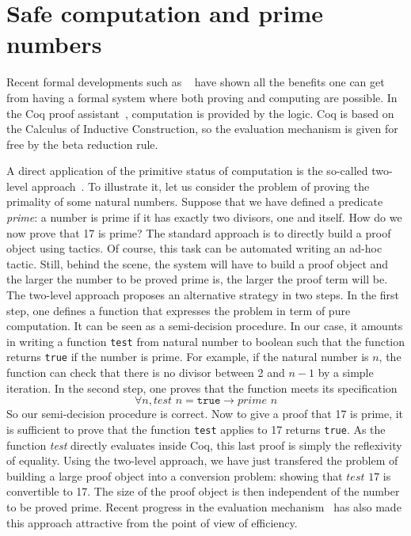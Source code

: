

\section{Safe computation and prime numbers}

Recent formal developments such as ~\cite{4color,kepler} have shown all the benefits
one can get from having a formal system where both proving and computing are
possible. In the {\sc Coq} proof assistant~\cite{Coq}, computation is
provided by the logic. {\sc Coq} is based on the Calculus of 
Inductive Construction, so the evaluation mechanism is given for free
by the beta reduction rule. 

A direct application of the primitive status of computation is 
the so-called two-level approach~\cite{boutin}. To illustrate it, 
let us consider the problem of proving the primality of some natural 
numbers.
Suppose that we have defined a predicate {\it prime}: a number is prime 
if it has exactly two divisors, one and itself. 
How do we now prove that 17 is prime? The standard approach is to
directly build a proof object using tactics. Of course, this task can be 
automated writing an ad-hoc tactic. Still, behind the scene, the system 
will have to build a proof object and the larger the number to be proved
prime is, the larger the proof term will be.
The two-level approach proposes an alternative
strategy in two steps. In the first step, one defines a function that expresses
the problem in term of pure computation. It can be seen as a semi-decision procedure.
In our case, it amounts in writing a 
function {\tt test} from natural number to boolean such that the function
returns {\tt true} if the number is prime. For example, if the natural number
is $n$, the function can check that there is no divisor between 2 and $n-1$
by a simple iteration. In the second step, one proves that the function meets 
its specification
$$
\forall n, \textit{test}\,\, n = \texttt{true} \rightarrow \textit{prime}\,\, n
$$
So our semi-decision procedure is correct.
Now to give a proof that 17 is prime, it is sufficient to prove that the function
{\tt test} applies to 17 returns {\tt true}. As the function {\it test} directly
evaluates inside {\sc Coq}, this last proof is simply the reflexivity of equality.
Using the two-level approach, we have just transfered the problem of building a 
large proof object into a conversion problem: showing that $test\,\, 17$ is convertible
to 17.  The size of the proof object is then independent of the number to be proved
prime. Recent progress in the evaluation mechanism~\cite{GreLer} has also made this
approach attractive from the point of view of efficiency.

